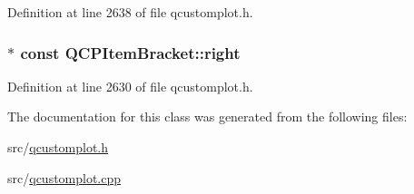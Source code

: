 Definition at line 2638 of file qcustomplot.\-h.

\hypertarget{class_q_c_p_item_bracket_afa6c1360b05a50c4e0df37b3cebab6be}{
\subsubsection[{right}]{$\ast$ const Q\-C\-P\-Item\-Bracket\-::right}}\label{class_q_c_p_item_bracket_afa6c1360b05a50c4e0df37b3cebab6be}


Definition at line 2630 of file qcustomplot.\-h.



The documentation for this class was generated from the following files\-:\begin{DoxyCompactItemize}
\item 
src/\hyperlink{qcustomplot_8h}{qcustomplot.\-h}\item 
src/\hyperlink{qcustomplot_8cpp}{qcustomplot.\-cpp}\end{DoxyCompactItemize}
